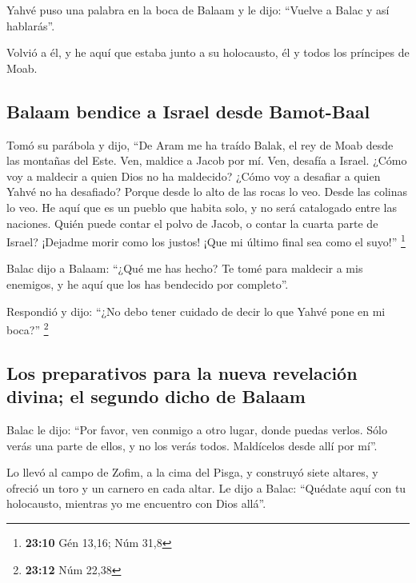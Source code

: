  Yahvé puso una palabra en la boca de Balaam y le dijo:
``Vuelve a Balac y así hablarás''.

 Volvió a él, y he aquí que estaba junto a su holocausto,
él y todos los príncipes de Moab.

\hypertarget{balaam-bendice-a-israel-desde-bamot-baal}{%
\subsection{Balaam bendice a Israel desde
Bamot-Baal}\label{balaam-bendice-a-israel-desde-bamot-baal}}

 Tomó su parábola y dijo, ``De Aram me ha traído Balak, el
rey de Moab desde las montañas del Este. Ven, maldice a Jacob por mí.
Ven, desafía a Israel.  ¿Cómo voy a maldecir a quien Dios
no ha maldecido? ¿Cómo voy a desafiar a quien Yahvé no ha desafiado?
 Porque desde lo alto de las rocas lo veo. Desde las
colinas lo veo. He aquí que es un pueblo que habita solo, y no será
catalogado entre las naciones.  Quién puede contar el
polvo de Jacob, o contar la cuarta parte de Israel? ¡Dejadme morir como
los justos! ¡Que mi último final sea como el suyo!'' \footnote{\textbf{23:10}
  Gén 13,16; Núm 31,8}

 Balac dijo a Balaam: ``¿Qué me has hecho? Te tomé para
maldecir a mis enemigos, y he aquí que los has bendecido por completo''.

 Respondió y dijo: ``¿No debo tener cuidado de decir lo
que Yahvé pone en mi boca?'' \footnote{\textbf{23:12} Núm 22,38}

\hypertarget{los-preparativos-para-la-nueva-revelaciuxf3n-divina-el-segundo-dicho-de-balaam}{%
\subsection{Los preparativos para la nueva revelación divina; el segundo
dicho de
Balaam}\label{los-preparativos-para-la-nueva-revelaciuxf3n-divina-el-segundo-dicho-de-balaam}}

 Balac le dijo: ``Por favor, ven conmigo a otro lugar,
donde puedas verlos. Sólo verás una parte de ellos, y no los verás
todos. Maldícelos desde allí por mí''.

 Lo llevó al campo de Zofim, a la cima del Pisga, y
construyó siete altares, y ofreció un toro y un carnero en cada altar.
 Le dijo a Balac: ``Quédate aquí con tu holocausto,
mientras yo me encuentro con Dios allá''.

